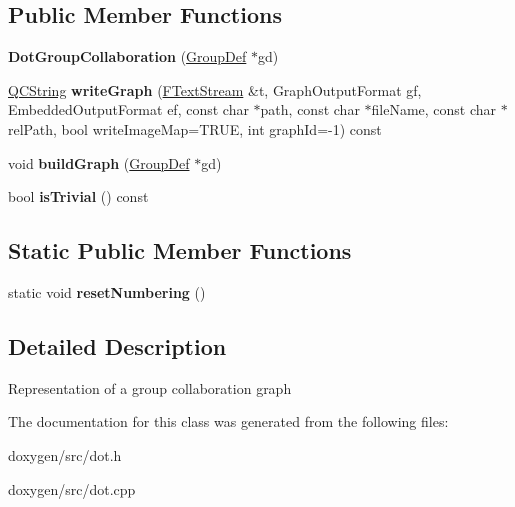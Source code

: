 \subsection*{Public Member Functions}
\begin{DoxyCompactItemize}
\item 
\mbox{\label{class_dot_group_collaboration_aa113b5a55446f4ea4aeab03a4b268387}} 
{\bfseries Dot\+Group\+Collaboration} (\mbox{\hyperlink{class_group_def}{Group\+Def}} $\ast$gd)
\item 
\mbox{\label{class_dot_group_collaboration_aed62be44e8e82e2d8b2ab132cc44cf2b}} 
\mbox{\hyperlink{class_q_c_string}{Q\+C\+String}} {\bfseries write\+Graph} (\mbox{\hyperlink{class_f_text_stream}{F\+Text\+Stream}} \&t, Graph\+Output\+Format gf, Embedded\+Output\+Format ef, const char $\ast$path, const char $\ast$file\+Name, const char $\ast$rel\+Path, bool write\+Image\+Map=T\+R\+UE, int graph\+Id=-\/1) const
\item 
\mbox{\label{class_dot_group_collaboration_a5d03d883816436706f414dd734013629}} 
void {\bfseries build\+Graph} (\mbox{\hyperlink{class_group_def}{Group\+Def}} $\ast$gd)
\item 
\mbox{\label{class_dot_group_collaboration_aff85d0009e3f7499e83ec7c346025a9e}} 
bool {\bfseries is\+Trivial} () const
\end{DoxyCompactItemize}
\subsection*{Static Public Member Functions}
\begin{DoxyCompactItemize}
\item 
\mbox{\label{class_dot_group_collaboration_a274b41718744101a281ff37a8acf1247}} 
static void {\bfseries reset\+Numbering} ()
\end{DoxyCompactItemize}


\subsection{Detailed Description}
Representation of a group collaboration graph 

The documentation for this class was generated from the following files\+:\begin{DoxyCompactItemize}
\item 
doxygen/src/dot.\+h\item 
doxygen/src/dot.\+cpp\end{DoxyCompactItemize}

